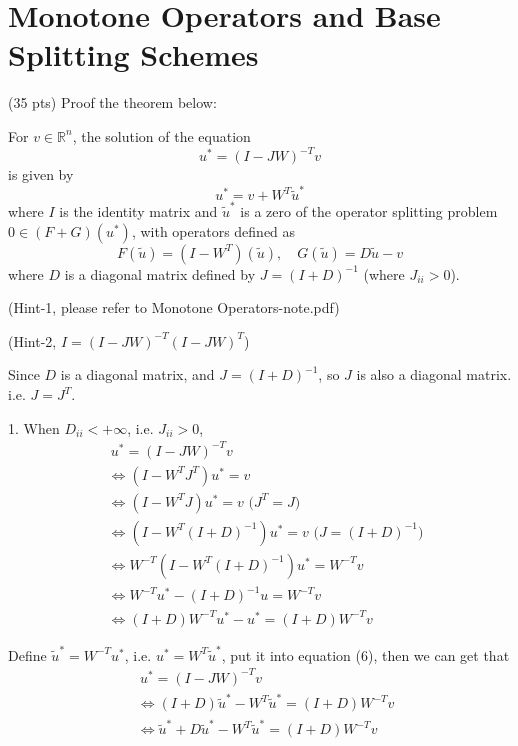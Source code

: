 \section{Monotone Operators and Base Splitting Schemes}
{\color{red} (35 pts)}
Proof the theorem below:
\begin{theorem}
For \(v \in \mathbb{R}^n\), the solution of the equation
\begin{equation}
u^* = (I - JW)^{-T}v
\end{equation}
is given by
\begin{equation}
u^* = v + W^T\tilde{u}^*
\end{equation}
where $I$ is the identity matrix and \(\tilde{u}^*\) is a zero of the operator splitting problem \(0 \in (F + G)(u^*)\), with operators defined as
\begin{equation}
F(\tilde{u}) = (I - W^T)(\tilde{u}), \quad G(\tilde{u}) = D\tilde{u} - v
\end{equation}
where \(D\) is a diagonal matrix defined by \(J = (I + D)^{-1}\) (where \( J_{ii} > 0 \)).
\end{theorem}
(Hint-1, please refer to Monotone Operators-note.pdf)
\par
(Hint-2, $I = (I-J W)^{-T} (I-J W)^{T}$)


\solution{}
Since $D$ is a diagonal matrix, and $J=(I+D)^{-1}$, so $J$ is also a diagonal matrix. i.e. $J=J^T$.

1. When $D_{ii}<+\infty$, i.e. $J_{ii}>0$,
\begin{equation}
\begin{aligned}
&\ u^*=(I-JW)^{-T}v \\
&\Leftrightarrow (I-W^TJ^T)u^*=v \\
&\Leftrightarrow (I-W^TJ)u^*=v \text{\ \ \ \ \ \ \ \ \ \ \ \ \ \ \ \ \ \ \ \ ($J^T=J$)} \\
&\Leftrightarrow (I-W^T(I+D)^{-1})u^*=v \text{\ \ \ \ \ \ \ \ \ ($J=(I+D)^{-1}$)} \\
&\Leftrightarrow W^{-T}(I-W^T(I+D)^{-1})u^*=W^{-T}v \\
&\Leftrightarrow W^{-T}u^*-(I+D)^{-1}u=W^{-T}v \\
&\Leftrightarrow (I+D)W^{-T}u^*-u^*=(I+D)W^{-T}v
\end{aligned}
\end{equation}

Define $\tilde{u}^*=W^{-T}u^*$, i.e. $u^*=W^T\tilde{u}^*$, put it into equation (6), then we can get that
\begin{equation}
\begin{aligned}
&\ u^*=(I-JW)^{-T}v \\
&\Leftrightarrow  (I+D)\tilde{u}^*-W^T\tilde{u}^*=(I+D)W^{-T}v \\
&\Leftrightarrow  \tilde{u}^*+D\tilde{u}^*-W^T\tilde{u}^*=(I+D)W^{-T}v
\end{aligned}
\end{equation}

